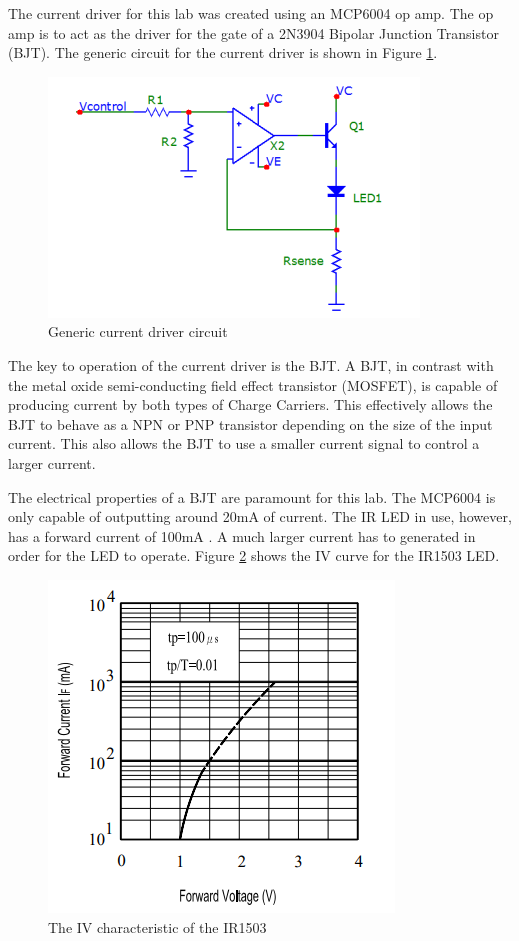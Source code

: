 
The current driver for this lab was created using an MCP6004 op amp. The op amp is to act as the driver for the gate of a 2N3904 Bipolar Junction Transistor (BJT). The generic circuit for the current driver is shown in Figure \ref{fig:currentgeneric}. 
	
	\begin{figure}[H]
		\centering
		\includegraphics[width=.55\textwidth]{CircuitDevelopment/ledgeneric.png}
		\caption{Generic current driver circuit \cite{b1}}
		\label{fig:currentgeneric}
	\end{figure}

The key to operation of the current driver is the BJT. A BJT, in contrast with the metal oxide semi-conducting field effect transistor (MOSFET), is capable of producing current by both types of Charge Carriers. This effectively allows the BJT to behave as a NPN or PNP transistor depending on the size of the input current. This also allows the BJT to use a smaller current signal to control a larger current. 

The electrical properties of a BJT are paramount for this lab. The MCP6004 is only capable of outputting around 20mA of current. The IR LED in use, however, has a forward current of 100mA \cite{LEDDATA}. A much larger current has to generated in order for the LED to operate. Figure \ref{fig:ivsvled} shows the IV curve for the IR1503 LED.


\begin{figure}[H]
	\centering
	\includegraphics[width=0.4\linewidth]{CircuitDevelopment/IvsVled}
	\caption[Current vs voltage]{The IV characteristic of the IR1503 \cite{LEDDATA}}
	\label{fig:ivsvled}
\end{figure}


